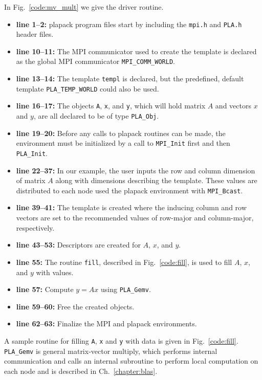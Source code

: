 In Fig.~\ref{code:mv_mult} we give the driver routine.
\begin{itemize}
\item{\bf line 1--2:}
plapack program files start by including the 
{\tt mpi.h} and {\tt PLA.h} header files.
\item
{\bf line 10--11:}
The MPI communicator used to create the template is declared
as the global MPI communicator {\tt MPI\_COMM\_WORLD}.
\item
{\bf line 13--14:}
The template {\tt templ} is declared, but 
the predefined, default template {\tt PLA\_TEMP\_WORLD} could also be used.
\item
{\bf line 16--17:}
The objects {\tt A}, {\tt x}, and {\tt y},
which will hold matrix $ A $ and vectors $ x $ and $ y $, 
are all declared to be of type {\tt PLA\_Obj}.
\item
{\bf line 19--20:}
Before any calls to plapack routines can be
made, the environment must be initialized by
a call to {\tt MPI\_Init} first and then {\tt PLA\_Init}.
\item
{\bf line 22--37:}
In our example, the user inputs the row 
and column dimension of matrix $ A $ 
along with dimensions describing the template.
These values are distributed to each node used 
the plapack environment with {\tt MPI\_Bcast}.
\item
{\bf line 39--41:}
The template is created where the
inducing column and row vectors are set
to the recommended values of row-major and column-major, respectively.
\item
{\bf line 43--53:}
Descriptors are created for $ A $, $ x $, and $ y $.
\item
{\bf line 55:}
The routine {\tt fill}, described in Fig.~\ref{code:fill}, 
is used to fill $ A $, $ x $, and $ y $ with values.
\item
{\bf line 57:}
Compute $ y = A x $ using {\tt PLA\_Gemv}.
\item
{\bf line 59--60:}
Free the created objects.
\item
{\bf line 62--63:}
Finalize the MPI and plapack environments.
\end{itemize}

A sample routine for filling {\tt A}, {\tt x} and {\tt y}
with data is given in Fig.~\ref{code:fill}.  
{\tt PLA\_Gemv} is general matrix-vector multiply, which
performs internal communication and calls an internal
subroutine to perform local computation on each node and is described
in Ch.~\ref{chapter:blas}.

